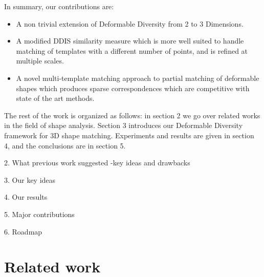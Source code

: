 \documentclass[10pt,twocolumn,letterpaper]{article}
\begin{document}
In summary, our contributions are:
\begin{itemize}
	\item A non trivial extension of Deformable Diversity from 2 to 3 Dimensions.
	\item A modified DDIS similarity measure which is more well suited to handle matching of templates with a different number of points, and is refined at multiple scales.
	\item A novel multi-template matching approach to partial matching of deformable shapes which produces sparse correspondences which are competitive with state of the art methods.
\end{itemize}

The rest of the work is organized as follows: in section 2 we go over related works in the field of shape analysis. Section 3 introduces our Deformable Diversity framework for 3D shape matching. Experiments and results are given in section 4, and the conclusions are in section 5.
{\color{red}
	2. What previous work suggested -key ideas and drawbacks
	
	3. Our key ideas
	
	4. Our results 
	
	5. Major contributions
	
	6. Roadmap}


\section{Related work}\label{chap:related work}
\end{document}
